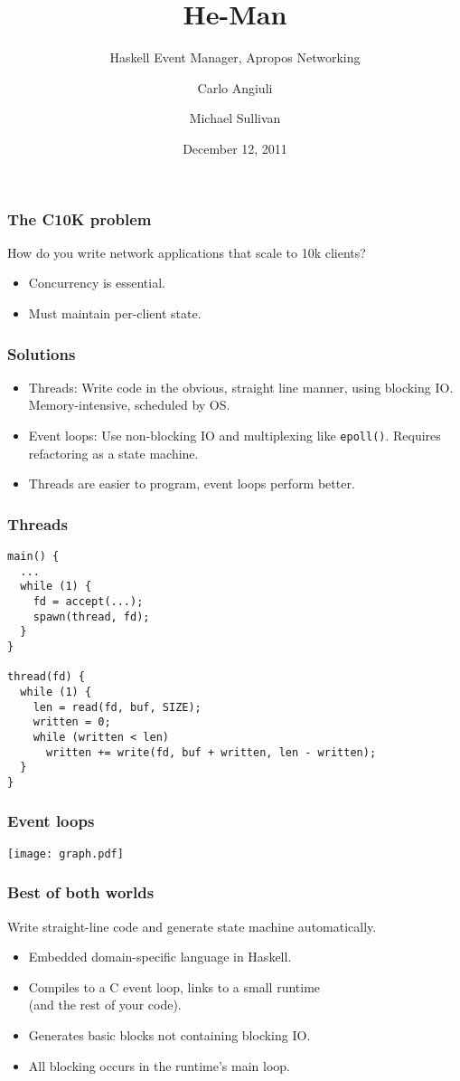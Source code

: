 \documentclass{beamer}
\title{He-Man}
\subtitle{Haskell Event Manager, Apropos Networking}
\author{Carlo Angiuli \and Michael Sullivan}
\date{December 12, 2011}
\renewcommand{\t}{\texttt}
\begin{document}
\begin{frame}
\maketitle
\end{frame}

\begin{frame}
\frametitle{The C10K problem}
How do you write network applications that scale to 10k clients?
\begin{itemize}
\item Concurrency is essential.
\item Must maintain per-client state.
\end{itemize}
\end{frame}

\begin{frame}
\frametitle{Solutions}
\begin{itemize}
\item Threads: Write code in the obvious, straight line manner, using blocking
IO. Memory-intensive, scheduled by OS.
\item Event loops: Use non-blocking IO and multiplexing like \t{epoll()}.
Requires refactoring as a state machine.
\item Threads are easier to program, event loops perform better.
\end{itemize}
\end{frame}

\begin{frame}[fragile]
\frametitle{Threads}
\small
\begin{verbatim}
main() {
  ...
  while (1) {
    fd = accept(...);
    spawn(thread, fd);
  }
}

thread(fd) {
  while (1) {
    len = read(fd, buf, SIZE);
    written = 0;
    while (written < len)
      written += write(fd, buf + written, len - written);
  }
}
\end{verbatim}
\end{frame}

\begin{frame}
\frametitle{Event loops}
\texttt{[image: graph.pdf]}
\end{frame}

\begin{frame}
\frametitle{Best of both worlds}
Write straight-line code and generate state machine automatically.
\begin{itemize}
\item Embedded domain-specific language in Haskell.
\item Compiles to a C event loop, links to a small runtime \\
(and the rest of your code).
\item Generates basic blocks not containing blocking IO.
\item All blocking occurs in the runtime's main loop.
\end{itemize}
\end{frame}
\end{document}
